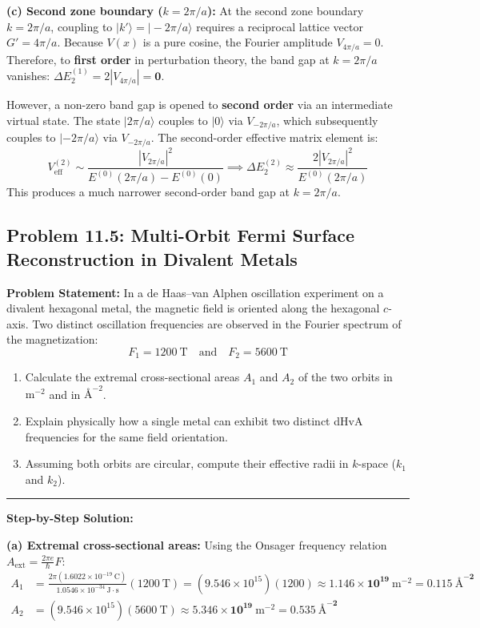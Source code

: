 \documentclass[11pt,a4paper]{article}
\begin{document}
\textbf{(c) Second zone boundary ($k = 2\pi/a$):}
At the second zone boundary $k = 2\pi/a$, coupling to $|k'\rangle = |-2\pi/a\rangle$ requires a reciprocal lattice vector $G' = 4\pi/a$.
Because $V(x)$ is a pure cosine, the Fourier amplitude $V_{4\pi/a} = 0$. 
Therefore, to \textbf{first order} in perturbation theory, the band gap at $k = 2\pi/a$ vanishes: $\Delta E_2^{(1)} = 2|V_{4\pi/a}| = \mathbf{0}$.

However, a non-zero band gap is opened to \textbf{second order} via an intermediate virtual state. The state $|2\pi/a\rangle$ couples to $|0\rangle$ via $V_{-2\pi/a}$, which subsequently couples to $|-2\pi/a\rangle$ via $V_{-2\pi/a}$. The second-order effective matrix element is:
\[
V_{\mathrm{eff}}^{(2)} \sim \frac{|V_{2\pi/a}|^2}{E^{(0)}(2\pi/a) - E^{(0)}(0)} \implies \Delta E_2^{(2)} \approx \frac{2|V_{2\pi/a}|^2}{E^{(0)}(2\pi/a)}
\]
This produces a much narrower second-order band gap at $k = 2\pi/a$.

\vspace{0.4cm}

\subsection{Problem 11.5: Multi-Orbit Fermi Surface Reconstruction in Divalent Metals}
\textbf{Problem Statement:}
In a de Haas--van Alphen oscillation experiment on a divalent hexagonal metal, the magnetic field is oriented along the hexagonal $c$-axis. Two distinct oscillation frequencies are observed in the Fourier spectrum of the magnetization:
\[
F_1 = 1200\ \mathrm{T} \quad \text{and} \quad F_2 = 5600\ \mathrm{T}
\]
\begin{enumerate}[label=(\alph*)]
    \item Calculate the extremal cross-sectional areas $A_1$ and $A_2$ of the two orbits in $\mathrm{m}^{-2}$ and in $\text{\AA}^{-2}$.
    \item Explain physically how a single metal can exhibit two distinct dHvA frequencies for the same field orientation.
    \item Assuming both orbits are circular, compute their effective radii in $k$-space ($k_1$ and $k_2$).
\end{enumerate}

\vspace{0.2cm}\hrule\vspace{0.2cm}
\textbf{Step-by-Step Solution:}

\textbf{(a) Extremal cross-sectional areas:}
Using the Onsager frequency relation $A_{\mathrm{ext}} = \frac{2\pi e}{\hbar}F$:
\begin{align*}
A_1 &= \frac{2\pi(1.6022 \times 10^{-19}\ \mathrm{C})}{1.0546 \times 10^{-34}\ \mathrm{J\cdot s}}(1200\ \mathrm{T}) = (9.546 \times 10^{15})(1200) \approx \mathbf{1.146 \times 10^{19}\ \mathrm{m^{-2}}} = \mathbf{0.115\ \text{\AA}^{-2}} \\
A_2 &= (9.546 \times 10^{15})(5600\ \mathrm{T}) \approx \mathbf{5.346 \times 10^{19}\ \mathrm{m^{-2}}} = \mathbf{0.535\ \text{\AA}^{-2}}
\end{align*}
\end{document}
